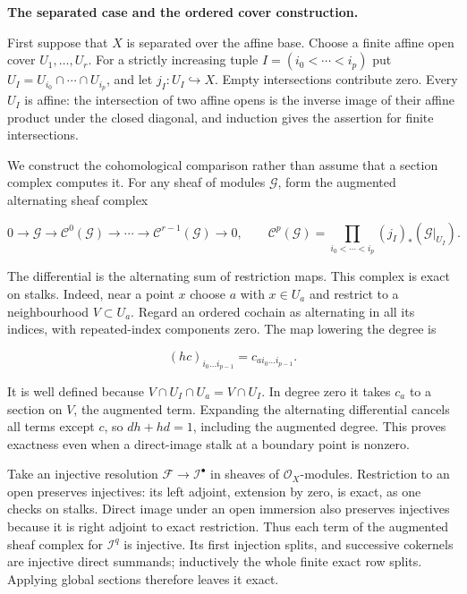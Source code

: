 \documentclass[11pt,a4paper,openany]{report}
\begin{document}
\textbf{The separated case and the ordered cover construction.}

First suppose that \(X\) is separated over the affine base. Choose a finite affine open cover \(U_1,\ldots,U_r\). For a strictly increasing tuple \(I=(i_0<\cdots<i_p)\) put \(U_I=U_{i_0}\cap\cdots\cap U_{i_p}\), and let \(j_I:U_I\hookrightarrow X\). Empty intersections contribute zero. Every \(U_I\) is affine: the intersection of two affine opens is the inverse image of their affine product under the closed diagonal, and induction gives the assertion for finite intersections.

We construct the cohomological comparison rather than assume that a section complex computes it. For any sheaf of modules \(\mathcal G\), form the augmented alternating sheaf complex

\[
0\longrightarrow\mathcal G\longrightarrow
\mathcal C^0(\mathcal G)\longrightarrow\cdots\longrightarrow
\mathcal C^{r-1}(\mathcal G)\longrightarrow0,
\qquad
\mathcal C^p(\mathcal G)=\prod_{i_0<\cdots<i_p}(j_I)_*(\mathcal G|_{U_I}).
\]

The differential is the alternating sum of restriction maps. This complex is exact on stalks. Indeed, near a point \(x\) choose \(a\) with \(x\in U_a\) and restrict to a neighbourhood \(V\subset U_a\). Regard an ordered cochain as alternating in all its indices, with repeated-index components zero. The map lowering the degree is

\[
(hc)_{i_0\ldots i_{p-1}}=c_{a i_0\ldots i_{p-1}}.
\]

It is well defined because \(V\cap U_I\cap U_a=V\cap U_I\). In degree zero it takes \(c_a\) to a section on \(V\), the augmented term. Expanding the alternating differential cancels all terms except \(c\), so \(dh+hd=1\), including the augmented degree. This proves exactness even when a direct-image stalk at a boundary point is nonzero.

Take an injective resolution \(\mathcal F\to\mathcal I^\bullet\) in sheaves of \(\mathcal O_X\)-modules. Restriction to an open preserves injectives: its left adjoint, extension by zero, is exact, as one checks on stalks. Direct image under an open immersion also preserves injectives because it is right adjoint to exact restriction. Thus each term of the augmented sheaf complex for \(\mathcal I^q\) is injective. Its first injection splits, and successive cokernels are injective direct summands; inductively the whole finite exact row splits. Applying global sections therefore leaves it exact.
\end{document}
